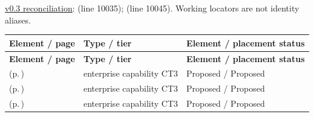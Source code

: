 \hyperref[model:reconciliation]{v0.3 reconciliation}: \texttt{} (line 10035); \texttt{} (line 10045). Working locators are not identity aliases.
\begingroup\small\setlength{\TableWidth}{\dimexpr\linewidth-6\tabcolsep-4\arrayrulewidth\relax}
\begin{longtable}{|>{\raggedright\arraybackslash}p{0.52\TableWidth}|>{\raggedright\arraybackslash}p{0.2\TableWidth}|>{\raggedright\arraybackslash}p{0.28\TableWidth}|}
\hline\rowcolor{TableHead}\textbf{Element / page} & \textbf{Type / tier} & \textbf{Element / placement status}\\\hline\endfirsthead
\hline\rowcolor{TableHead}\textbf{Element / page} & \textbf{Type / tier} & \textbf{Element / placement status}\\\hline\endhead
\hline\endfoot
\nameref{cap:ec-active-information-availability} (p.\,\pageref{cap:ec-active-information-availability}) & enterprise capability CT3 & Proposed / Proposed\\\hline
\nameref{cap:ec-authoritative-durable-state-establishment} (p.\,\pageref{cap:ec-authoritative-durable-state-establishment}) & enterprise capability CT3 & Proposed / Proposed\\\hline
\nameref{cap:ec-binary-content-association-resolution} (p.\,\pageref{cap:ec-binary-content-association-resolution}) & enterprise capability CT3 & Proposed / Proposed\\\hline
\end{longtable}\endgroup

